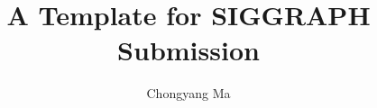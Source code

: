 









\title{A Template for SIGGRAPH Submission}

\author{Chongyang Ma}





\renewcommand{\shortauthors}{C. Ma}



\maketitle








{

}


